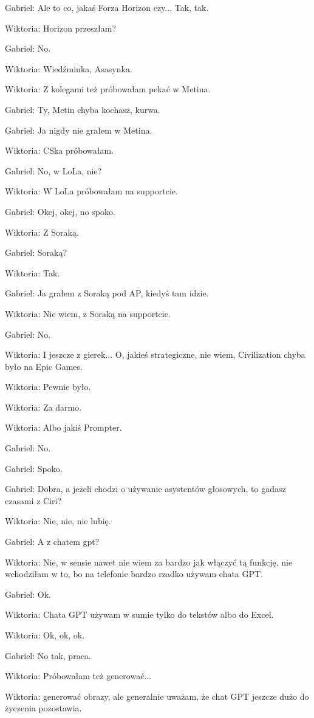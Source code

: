Gabriel: Ale to co, jakaś Forza Horizon czy... Tak, tak.

Wiktoria: Horizon przeszłam?

Gabriel: No.

Wiktoria: Wiedźminka, Asasynka.

Wiktoria: Z kolegami też próbowałam pekać w Metina.

Gabriel: Ty, Metin chyba kochasz, kurwa.

Gabriel: Ja nigdy nie grałem w Metina.

Wiktoria: CSka próbowałam.

Gabriel: No, w LoLa, nie?

Wiktoria: W LoLa próbowałam na supportcie.

Gabriel: Okej, okej, no spoko.

Wiktoria: Z Soraką.

Gabriel: Soraką?

Wiktoria: Tak.

Gabriel: Ja grałem z Soraką pod AP, kiedyś tam idzie.

Wiktoria: Nie wiem, z Soraką na supportcie.

Gabriel: No.

Wiktoria: I jeszcze z gierek... O, jakieś strategiczne, nie wiem, Civilization chyba było na Epic Games.

Wiktoria: Pewnie było.

Wiktoria: Za darmo.

Wiktoria: Albo jakiś Prompter.

Gabriel: No.

Gabriel: Spoko.

Gabriel: Dobra, a jeżeli chodzi o używanie asystentów głosowych, to gadasz czasami z Ciri?

Wiktoria: Nie, nie, nie lubię.

Gabriel: A z chatem gpt?

Wiktoria: Nie, w sensie nawet nie wiem za bardzo jak włączyć tą funkcję, nie wchodziłam w to, bo na telefonie bardzo rzadko używam chata GPT.

Gabriel: Ok.

Wiktoria: Chata GPT używam w sumie tylko do tekstów albo do Excel.

Wiktoria: Ok, ok, ok.

Gabriel: No tak, praca.

Wiktoria: Próbowałam też generować...

Wiktoria: generować obrazy, ale generalnie uważam, że chat GPT jeszcze dużo do życzenia pozostawia.

